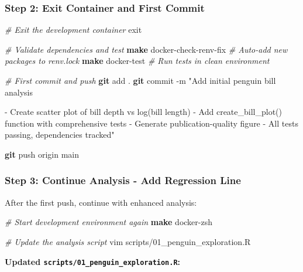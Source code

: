 \documentclass[
]{article}
\newenvironment{Shaded}{\begin{snugshade}}{\end{snugshade}}
\newcommand{\AttributeTok}[1]{\textcolor[rgb]{0.13,0.29,0.53}{#1}}
\newcommand{\BuiltInTok}[1]{#1}
\newcommand{\CommentTok}[1]{\textcolor[rgb]{0.56,0.35,0.01}{\textit{#1}}}
\newcommand{\ExtensionTok}[1]{#1}
\newcommand{\FunctionTok}[1]{\textcolor[rgb]{0.13,0.29,0.53}{\textbf{#1}}}
\newcommand{\NormalTok}[1]{#1}
\newcommand{\StringTok}[1]{\textcolor[rgb]{0.31,0.60,0.02}{#1}}
\begin{document}
\subsubsection{Step 2: Exit Container and First
Commit}\label{step-2-exit-container-and-first-commit}

\begin{Shaded}
\begin{Highlighting}[]
\CommentTok{\# Exit the development container}
\BuiltInTok{exit}

\CommentTok{\# Validate dependencies and test}
\FunctionTok{make}\NormalTok{ docker{-}check{-}renv{-}fix    }\CommentTok{\# Auto{-}add new packages to renv.lock}
\FunctionTok{make}\NormalTok{ docker{-}test             }\CommentTok{\# Run tests in clean environment}

\CommentTok{\# First commit and push}
\FunctionTok{git}\NormalTok{ add .}
\FunctionTok{git}\NormalTok{ commit }\AttributeTok{{-}m} \StringTok{"Add initial penguin bill analysis}

\StringTok{{-} Create scatter plot of bill depth vs log(bill length)}
\StringTok{{-} Add create\_bill\_plot() function with comprehensive tests}
\StringTok{{-} Generate publication{-}quality figure}
\StringTok{{-} All tests passing, dependencies tracked"}

\FunctionTok{git}\NormalTok{ push origin main}
\end{Highlighting}
\end{Shaded}

\subsubsection{Step 3: Continue Analysis - Add Regression
Line}\label{step-3-continue-analysis---add-regression-line}

After the first push, continue with enhanced analysis:

\begin{Shaded}
\begin{Highlighting}[]
\CommentTok{\# Start development environment again}
\FunctionTok{make}\NormalTok{ docker{-}zsh}

\CommentTok{\# Update the analysis script}
\ExtensionTok{vim}\NormalTok{ scripts/01\_penguin\_exploration.R}
\end{Highlighting}
\end{Shaded}

\textbf{Updated \texttt{scripts/01\_penguin\_exploration.R}:}
\end{document}
